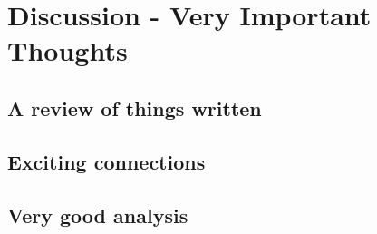 \chapter{Discussion - Very Important Thoughts}
\section{A review of things written}
\section{Exciting connections}
\section{Very good analysis}